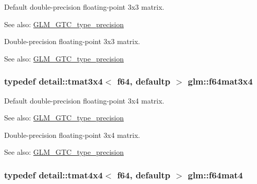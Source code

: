Default double-precision floating-point 3x3 matrix. \begin{Desc}
\item[See also:]\hyperlink{group__gtc__type__precision}{GLM\_\-GTC\_\-type\_\-precision}\end{Desc}
Double-precision floating-point 3x3 matrix. \begin{Desc}
\item[See also:]\hyperlink{group__gtc__type__precision}{GLM\_\-GTC\_\-type\_\-precision} \end{Desc}
\hypertarget{group__gtc__type__precision_gc9468e5fa519d06b452d3126bb22a597}{
\subsubsection[f64mat3x4]{\setlength{\rightskip}{0pt plus 5cm}typedef detail::tmat3x4$<$ f64, defaultp $>$ {\bf glm::f64mat3x4}}}
\label{group__gtc__type__precision_gc9468e5fa519d06b452d3126bb22a597}


Default double-precision floating-point 3x4 matrix. \begin{Desc}
\item[See also:]\hyperlink{group__gtc__type__precision}{GLM\_\-GTC\_\-type\_\-precision}\end{Desc}
Double-precision floating-point 3x4 matrix. \begin{Desc}
\item[See also:]\hyperlink{group__gtc__type__precision}{GLM\_\-GTC\_\-type\_\-precision} \end{Desc}
\hypertarget{group__gtc__type__precision_g1e2d73ea989e6a5abd90cbe9f1025a41}{
\subsubsection[f64mat4]{\setlength{\rightskip}{0pt plus 5cm}typedef detail::tmat4x4$<$ f64, defaultp $>$ {\bf glm::f64mat4}}}
\label{group__gtc__type__precision_g1e2d73ea989e6a5abd90cbe9f1025a41}


